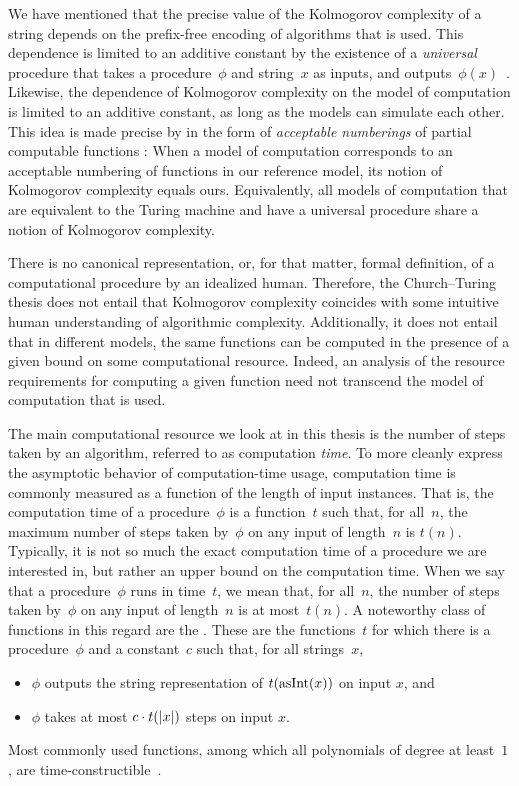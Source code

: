 We have mentioned that the precise value of the Kolmogorov complexity of a string depends on the prefix-free encoding of algorithms that is used.
This dependence is limited to an additive constant by the existence of a \emph{universal} procedure that takes a procedure~$\phi$ and string~$x$ as inputs, and outputs~$\phi(x)$~\parencite{li2008introduction,goldreich2008computational}.
Likewise, the dependence of Kolmogorov complexity on the model of computation is limited to an additive constant, as long as the models can simulate each other.
This idea is made precise by \textcite{rogers1967theory} in the form of \emph{acceptable numberings} of partial computable functions \parencite[see also][]{soare2016turing}:
When a model of computation corresponds to an acceptable numbering of functions in our reference model, its notion of Kolmogorov complexity equals ours.
Equivalently, all models of computation that are equivalent to the Turing machine and have a universal procedure share a notion of Kolmogorov complexity.

There is no canonical representation, or, for that matter, formal definition, of a computational procedure by an idealized human.
Therefore, the Church--Turing thesis does not entail that Kolmogorov complexity coincides with some intuitive human understanding of algorithmic complexity.
Additionally, it does not entail that in different models, the same functions can be computed in the presence of a given bound on some computational resource.
Indeed, an analysis of the resource requirements for computing a given function need not transcend the model of computation that is used.

The main computational resource we look at in this thesis is the number of steps taken by an algorithm, referred to as computation \emph{time}.
To more cleanly express the asymptotic behavior of computation-time usage, computation time is commonly measured as a function of the length of input instances.
That is, the computation time of a procedure~$\phi$ is a function~$t$ such that, for all~$n$, the maximum number of steps taken by~$\phi$ on any input of length~$n$ is $t(n)$.
Typically, it is not so much the exact computation time of a procedure we are interested in, but rather an upper bound on the computation time.
When we say that a procedure~$\phi$ runs in time~$t$, we mean that, for all~$n$, the number of steps taken by~$\phi$ on any input of length~$n$ is at most~$t(n)$.
A noteworthy class of functions in this regard are the .
These are the functions~$t$ for which there is a procedure~$\phi$ and a constant~$c$ such that, for all strings~$x$,
\begin{itemize}
\item $\phi$ outputs the string representation of $t(\operatorname{asInt}(x))$ on input $x$, and
\item $\phi$ takes at most $c \cdot t({\lvert x\rvert})$ steps on input $x$.
\end{itemize}
Most commonly used functions, among which all polynomials of degree at least~$1$, are time-constructible~\parencite{arora2009computational}.

